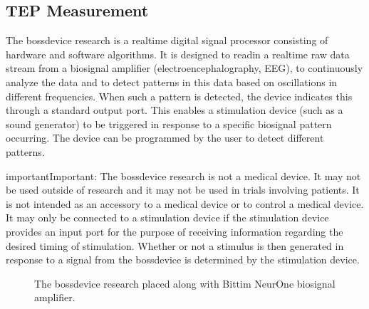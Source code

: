 \documentclass[letterpaper,10pt,english]{sphinxmanual}
\begin{document}
\begin{figure}[htbp]
\centering

\noindent{}
\end{figure}


\subsection{TEP Measurement}
\label{\detokenize{11_TEPMeasurement:tep-measurement}}\label{\detokenize{11_TEPMeasurement::doc}}
\sphinxAtStartPar
The bossdevice research is a real\sphinxhyphen{}time digital signal processor consisting of hardware and software algorithms. It is designed to read\sphinxhyphen{}in a real\sphinxhyphen{}time raw data stream from a biosignal amplifier (electroencephalography, EEG), to continuously analyze the data and to detect patterns in this data based on oscillations in different frequencies. When such a pattern is detected, the device indicates this through a standard output port. This enables a stimulation device (such as a sound generator) to be triggered in response to a specific biosignal pattern occurring. The device can be programmed by the user to detect different patterns.

\begin{sphinxadmonition}{important}{Important:}
\sphinxAtStartPar
The bossdevice research is not a medical device. It may not be used outside of research and it may not be used in trials involving patients. It is not intended as an accessory to a medical device or to control a medical device. It may only be connected to a stimulation device if the stimulation device provides an input port for the purpose of receiving information regarding the desired timing of stimulation. Whether or not a stimulus is then generated in response to a signal from the bossdevice is determined by the stimulation device.
\end{sphinxadmonition}

\begin{figure}[htbp]
\centering
\capstart

\noindent{}
\caption{The bossdevice research placed along with Bittim NeurOne biosignal amplifier.}\label{\detokenize{11_TEPMeasurement:id1}}\end{figure}
\end{document}
